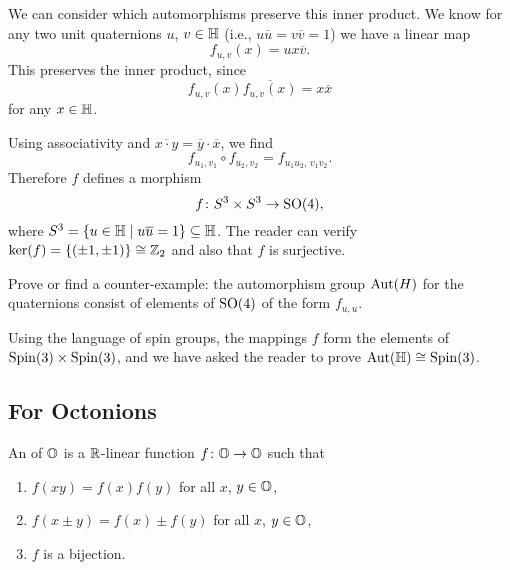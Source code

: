 We can consider which automorphisms preserve this inner product. We know
for any two unit quaternions $u$, $v\in\mathbb{H}$ (i.e.,
$u\overline{u}=v\overline{v}=1$) we have a linear map
\begin{equation}
f_{u,v}(x) = ux\overline{v}.
\end{equation}
This preserves the inner product, since
\begin{equation}
f_{u,v}(x)\overline{f_{u,v}(x)}=x\overline{x}
\end{equation}
for any $x\in\mathbb{H}$.

Using associativity and $\overline{x\cdot y}=\overline{y}\cdot\overline{x}$, we
find
\begin{equation}
f_{u_{1},v_{1}}\circ f_{u_{2},v_{2}} = f_{u_{1}u_{2},\,v_{1}v_{2}}.
\end{equation}
Therefore $f$ defines a morphism
\begin{equation}
f\colon S^{3}\times S^{3}\to\operatorname{SO}(4),
\end{equation}
where $S^{3}=\{u\in\mathbb{H}\mid u\overline{u}=1\}\subseteq\mathbb{H}$. The reader can
verify $\ker(f)=\{(\pm1,\pm1)\}\cong\mathbb{Z}_{2}$ and also that $f$ is
surjective.

\begin{exercise}
Prove or find a counter-example:
the automorphism group $\operatorname{Aut}(H)$ for the quaternions consist of elements
of $\operatorname{SO}(4)$ of the form $f_{u,u}$.
\end{exercise}

\begin{remark}
Using the language of spin groups, the mappings $f$ form the elements of
$\operatorname{Spin}(3)\times\operatorname{Spin}(3)$, and we have asked the reader to prove
$\operatorname{Aut}(\mathbb{H})\cong\operatorname{Spin}(3)$. 
\end{remark}

\subsection{For Octonions}

\begin{definition}
An  of $\mathbb{O}$ is a $\mathbb{R}$-linear function
$f\colon\mathbb{O}\to\mathbb{O}$ such that
\begin{enumerate}
\item $f(xy)=f(x)f(y)$ for all $x$, $y\in\mathbb{O}$,
\item $f(x\pm y)=f(x)\pm f(y)$ for all $x$, $y\in\mathbb{O}$,
\item $f$ is a bijection.
\end{enumerate}
\end{definition}

